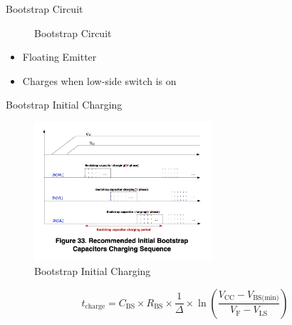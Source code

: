 \begin{frame}{Bootstrap Circuit}
	\begin{figure}
		\centering


		\caption{Bootstrap Circuit}
	\end{figure}

	\begin{itemize}
		\item Floating Emitter
		\item Charges when low-side switch is on
	\end{itemize}
\end{frame}




\begin{frame}{Bootstrap Initial Charging}
	\begin{figure}
		\centering
		\includegraphics[width=2.6in]{sections/ppt/initalChargingGraph.jpg}
		\caption{Bootstrap Initial Charging}
	\end{figure}

	\begin{equation}
		t_\text{charge} = C_\text{BS} \times R_\text{BS} \times \frac{1}{\Delta} \times \ln\left(\frac{V_\text{CC} - V_\text{BS(min)}}{V_\text{F} - V_\text{LS}}\right)
	\end{equation}
\end{frame}

